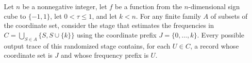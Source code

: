 \begin{theorem}
\label{FABL.goldreichLevinStageEstimateProgram_covers}
\leanok
{}
Let $n$ be a nonnegative integer, let $f$ be a function from the $n$-dimensional sign
cube to $\{ -1,1 \}$, let $0<\tau\le 1$, and let $k<n$. For any finite family $A$ of
subsets of the coordinate set, consider the stage that estimates the frequencies in
$C=\bigcup_{S\in A}\{S,S\cup\{k\}\}$ using the coordinate prefix
$J=\{0,\ldots,k\}$. Every possible output trace of this randomized stage contains,
for each $U\in C$, a record whose coordinate set is $J$ and whose frequency prefix is
$U$.
\end{theorem}

